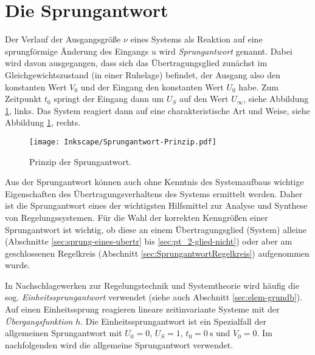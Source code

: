 \section{Die Sprungantwort}
\label{sec:sprungantwort}
Der Verlauf der Ausgangsgröße $\nu$ eines Systems als Reaktion auf eine sprungförmige Änderung des Eingangs $u$ wird \emph{Sprungantwort} genannt.
Dabei wird davon ausgegangen, dass sich das Übertragungsglied zunächst im Gleichgewichtszustand (in einer Ruhelage) befindet, der Ausgang also den konstanten Wert $V_0$ und der Eingang den konstanten Wert $U_0$ habe. Zum Zeitpunkt $t_0$ springt der Eingang dann um $U_S$ auf den Wert $U_\infty$,
siehe Abbildung \ref{fig:Sprungantwort-Prinzip}, links. Das System reagiert dann auf eine charakteristische Art und Weise, siehe Abbildung \ref{fig:Sprungantwort-Prinzip}, rechts.

\begin{figure}[ht]
    \centering
    \texttt{[image: Inkscape/Sprungantwort-Prinzip.pdf]}
    \caption{Prinzip der Sprungantwort.}
    \label{fig:Sprungantwort-Prinzip}
\end{figure}

Aus der Sprungantwort können auch ohne Kenntnis des Systemaufbaus wichtige Eigenschaften des Übertra\-gungsverhaltens des Systems ermittelt werden. Daher ist die Sprungantwort eines der wichtigsten Hilfsmittel zur Analyse und Synthese von Regelungssystemen.
Für die Wahl der korrekten Kenngrößen einer Sprungantwort ist wichtig, ob diese an einem Übertragungsglied (System) alleine (Abschnitte \ref{sec:sprung-eines-ubertr} bis \ref{sec:pt_2-glied-nicht}) oder aber am geschlossenen Regelkreis (Abschnitt \ref{sec:SprungantwortRegelkreis}) aufgenommen wurde.
\begin{RstWichtigBox}
    In Nachschlagewerken zur Regelungstechnik und Systemtheorie wird häufig die sog. \emph{Einheitssprungantwort} verwendet (siehe auch Abschnitt \ref{sec:elem-grundb}). Auf einen Einheitssprung reagieren lineare zeitinvariante Systeme mit der \emph{Übergangsfunktion} $h$. Die Einheitssprungantwort ist ein Spezialfall der allgemeinen Sprungantwort mit $U_0 = 0$, $U_S = 1$, $t_0 = \qty{0}{\second}$ und $V_0 = 0$.
    Im nachfolgenden wird die allgemeine Sprungantwort verwendet.
\end{RstWichtigBox}

